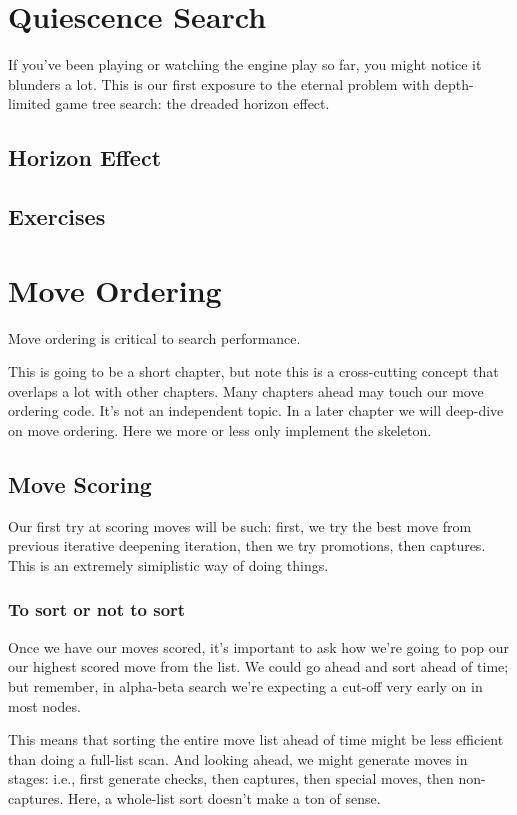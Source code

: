 \documentclass[letterpaper,11pt]{article}
\begin{document}
\section{Quiescence Search}


If you've been playing or watching the engine play so far, you might notice it blunders a lot. This is our first 
exposure to the eternal problem with depth-limited game tree search: the dreaded horizon effect.

\subsection{Horizon Effect}

\subsection{Exercises}

\section{Move Ordering}
Move ordering is critical to search performance.

This is going to be a short chapter, 
but note this is a cross-cutting concept that overlaps a lot with other chapters.
Many chapters ahead may touch our move ordering code. It's not an independent topic.
In a later chapter we will deep-dive on move ordering. Here we more or less only 
implement the skeleton.

\subsection{Move Scoring}
Our first try at scoring moves will be such: first, we try the best move from previous iterative 
deepening iteration, then we try promotions, then captures. This is an extremely simiplistic way of doing 
things.

\subsubsection*{To sort or not to sort}

Once we have our moves scored, it's important to ask how we're going to pop our
our highest scored move from the list. We could go ahead and sort ahead of time;
but remember, in alpha-beta search we're expecting a cut-off very early on in most nodes.

This means that sorting the entire move list ahead of time might be less efficient than 
doing a full-list scan. And looking ahead, we might generate moves in stages: i.e.,
first generate checks, then captures, then special moves, then non-captures. Here, a whole-list 
sort doesn't make a ton of sense.
\end{document}
